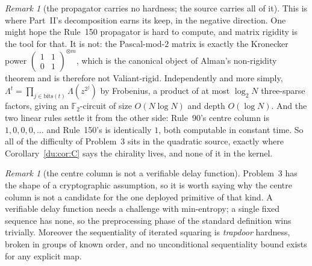 \documentclass[11pt]{article}
\theoremstyle{definition}
\theoremstyle{remark}
\newtheorem{remark}[theorem]{Remark}
\newcommand{\F}{\mathbb{F}_2}
\begin{document}
\begin{remark}[the propagator carries no hardness; the source carries all of it]\label{p3:rigidity}
This is where Part~II's decomposition earns its keep, in the negative direction. One might hope the
Rule~150 propagator is hard to compute, and matrix rigidity is the tool for that. It is not: the
Pascal-mod-$2$ matrix is exactly the Kronecker power $\left(\begin{smallmatrix}1&1\\0&1\end{smallmatrix}\right)^{\otimes m}$,
which is the canonical object of Alman's non-rigidity theorem \cite[Thm.~1.8]{Alman} and is therefore
not Valiant-rigid. Independently and more simply, $\Lambda^{t}=\prod_{j\in\mathrm{bits}(t)}\Lambda(z^{2^{j}})$
by Frobenius, a product of at most $\log_2 N$ three-sparse factors, giving an $\F$-circuit of size
$O(N\log N)$ and depth $O(\log N)$. And the two linear rules settle it from the other side: Rule~90's
centre column is $1,0,0,0,\dots$ and Rule~150's is identically $1$, both computable in constant time.
So all of the difficulty of Problem~3 sits in the quadratic source, exactly where
Corollary~\ref{du:cor:C} says the chirality lives, and none of it in the kernel.
\end{remark}

\begin{remark}[the centre column is not a verifiable delay function]\label{p3:vdf}
Problem~3 has the shape of a cryptographic assumption, so it is worth saying why the centre column is
not a candidate for the one deployed primitive of that kind. A verifiable delay function needs a
challenge with min-entropy; a single fixed sequence has none, so the preprocessing phase of the
standard definition wins trivially. Moreover the sequentiality of iterated squaring is \emph{trapdoor}
hardness, broken in groups of known order, and no unconditional sequentiality bound exists for any
explicit map.
\end{remark}
\end{document}
